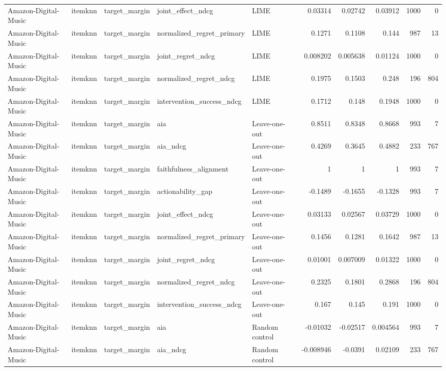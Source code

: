 \begin{table}[t]
\begin{tabular}{lllllrrrrr}
Amazon-Digital-Music & itemknn & target\_margin & joint\_effect\_ndcg & LIME & 0.03314 & 0.02742 & 0.03912 & 1000 & 0 \\
Amazon-Digital-Music & itemknn & target\_margin & normalized\_regret\_primary & LIME & 0.1271 & 0.1108 & 0.144 & 987 & 13 \\
Amazon-Digital-Music & itemknn & target\_margin & joint\_regret\_ndcg & LIME & 0.008202 & 0.005638 & 0.01124 & 1000 & 0 \\
Amazon-Digital-Music & itemknn & target\_margin & normalized\_regret\_ndcg & LIME & 0.1975 & 0.1503 & 0.248 & 196 & 804 \\
Amazon-Digital-Music & itemknn & target\_margin & intervention\_success\_ndcg & LIME & 0.1712 & 0.148 & 0.1948 & 1000 & 0 \\
Amazon-Digital-Music & itemknn & target\_margin & aia & Leave-one-out & 0.8511 & 0.8348 & 0.8668 & 993 & 7 \\
Amazon-Digital-Music & itemknn & target\_margin & aia\_ndcg & Leave-one-out & 0.4269 & 0.3645 & 0.4882 & 233 & 767 \\
Amazon-Digital-Music & itemknn & target\_margin & faithfulness\_alignment & Leave-one-out & 1 & 1 & 1 & 993 & 7 \\
Amazon-Digital-Music & itemknn & target\_margin & actionability\_gap & Leave-one-out & -0.1489 & -0.1655 & -0.1328 & 993 & 7 \\
Amazon-Digital-Music & itemknn & target\_margin & joint\_effect\_ndcg & Leave-one-out & 0.03133 & 0.02567 & 0.03729 & 1000 & 0 \\
Amazon-Digital-Music & itemknn & target\_margin & normalized\_regret\_primary & Leave-one-out & 0.1456 & 0.1281 & 0.1642 & 987 & 13 \\
Amazon-Digital-Music & itemknn & target\_margin & joint\_regret\_ndcg & Leave-one-out & 0.01001 & 0.007009 & 0.01322 & 1000 & 0 \\
Amazon-Digital-Music & itemknn & target\_margin & normalized\_regret\_ndcg & Leave-one-out & 0.2325 & 0.1801 & 0.2868 & 196 & 804 \\
Amazon-Digital-Music & itemknn & target\_margin & intervention\_success\_ndcg & Leave-one-out & 0.167 & 0.145 & 0.191 & 1000 & 0 \\
Amazon-Digital-Music & itemknn & target\_margin & aia & Random control & -0.01032 & -0.02517 & 0.004564 & 993 & 7 \\
Amazon-Digital-Music & itemknn & target\_margin & aia\_ndcg & Random control & -0.008946 & -0.0391 & 0.02109 & 233 & 767 \\

\end{tabular}
\end{table}
